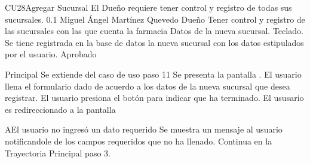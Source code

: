 \begin{UseCase}{CU28}{Agregar Sucursal}
{
    El Due\~no requiere tener control y registro de todas sus sucursales.
}
    {
	\color{Gray} 0.1 
    }
    {
	\color{Gray} Miguel \'Angel Mart\'inez Quevedo
    }
    {
	\color{Gray}
    }
    {
	Due\~no
    }
    {
	Tener control y registro de las sucursales con las que cuenta la farmacia
    }
    {
	Datos de la nueva sucursal.
    }
    {
	Teclado.
    }
    {}
    {}
    {}
    {
	Se tiene registrada en la base de datos la nueva sucursal con los datos estipulados por el
	usuario.
    }
    {}
    {}
    {}
    {
		Aprobado
	}
\end{UseCase}

\begin{UCtrayectoria}{Principal}
    \UCpaso Se extiende del caso de uso  paso 11
    \UCpaso Se presenta la pantalla .
    \UCpaso El usuario llena el formulario dado de acuerdo a los datos de la nueva sucursal que
    desea registrar.
    \UCpaso El usuario presiona el bot\'on  para indicar que ha terminado.
    \UCpaso El ususario es redireccionado a la pantalla 
\end{UCtrayectoria}

\begin{UCtrayectoriaA}{A}{El usuario no ingres\'o un dato requerido}
    \UCpaso Se muestra un mensaje al usuario notificandole de los campos requeridos que no ha
    llenado.
    \UCpaso Continua en la Trayectoria Principal paso 3.
\end{UCtrayectoriaA}


